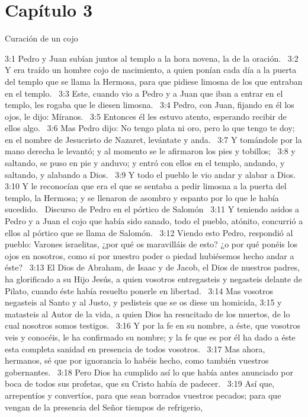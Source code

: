 \section*{Capítulo 3 }
Curación de un cojo  

3:1 Pedro y Juan subían juntos al templo a la hora novena, la de la oración.  
3:2 Y era traído un hombre cojo de nacimiento, a quien ponían cada día a la puerta del templo que se llama la Hermosa, para que pidiese limosna de los que entraban en el templo.  
3:3 Este, cuando vio a Pedro y a Juan que iban a entrar en el templo, les rogaba que le diesen limosna.  
3:4 Pedro, con Juan, fijando en él los ojos, le dijo: Míranos.  
3:5 Entonces él les estuvo atento, esperando recibir de ellos algo.  
3:6 Mas Pedro dijo: No tengo plata ni oro, pero lo que tengo te doy; en el nombre de Jesucristo de Nazaret, levántate y anda.  
3:7 Y tomándole por la mano derecha le levantó; y al momento se le afirmaron los pies y tobillos;  
3:8 y saltando, se puso en pie y anduvo; y entró con ellos en el templo, andando, y saltando, y alabando a Dios.  
3:9 Y todo el pueblo le vio andar y alabar a Dios.  
3:10 Y le reconocían que era el que se sentaba a pedir limosna a la puerta del templo, la Hermosa; y se llenaron de asombro y espanto por lo que le había sucedido.  
Discurso de Pedro en el pórtico de Salomón  
3:11 Y teniendo asidos a Pedro y a Juan el cojo que había sido sanado, todo el pueblo, atónito, concurrió a ellos al pórtico que se llama de Salomón.  
3:12 Viendo esto Pedro, respondió al pueblo: Varones israelitas, ¿por qué os maravilláis de esto? ¿o por qué ponéis los ojos en nosotros, como si por nuestro poder o piedad hubiésemos hecho andar a éste?  
3:13 El Dios de Abraham, de Isaac y de Jacob, el Dios de nuestros padres, ha glorificado a su Hijo Jesús, a quien vosotros entregasteis y negasteis delante de Pilato, cuando éste había resuelto ponerle en libertad.  
3:14 Mas vosotros negasteis al Santo y al Justo, y pedisteis que se os diese un homicida, 
3:15 y matasteis al Autor de la vida, a quien Dios ha resucitado de los muertos, de lo cual nosotros somos testigos.  
3:16 Y por la fe en su nombre, a éste, que vosotros veis y conocéis, le ha confirmado su nombre; y la fe que es por él ha dado a éste esta completa sanidad en presencia de todos vosotros.  
3:17 Mas ahora, hermanos, sé que por ignorancia lo habéis hecho, como también vuestros gobernantes.  
3:18 Pero Dios ha cumplido así lo que había antes anunciado por boca de todos sus profetas, que su Cristo había de padecer.  
3:19 Así que, arrepentíos y convertíos, para que sean borrados vuestros pecados; para que vengan de la presencia del Señor tiempos de refrigerio,  
